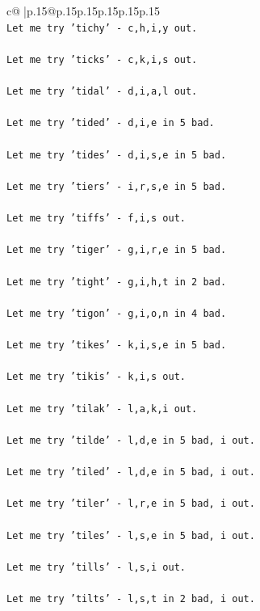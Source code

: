 \documentclass{article}
\begin{document}
{\begin{supertabular}{c@{$\;$}|p{.15\linewidth}@{}p{.15\linewidth}p{.15\linewidth}p{.15\linewidth}p{.15\linewidth}p{.15\linewidth}}
{{{\\ 
\texttt{Let me try 'tichy' {-} c,h,i,y out. } \\
\\ 
\texttt{Let me try 'ticks' {-} c,k,i,s out. } \\
\\ 
\texttt{Let me try 'tidal' {-} d,i,a,l out. } \\
\\ 
\texttt{Let me try 'tided' {-} d,i,e in 5 bad. } \\
\\ 
\texttt{Let me try 'tides' {-} d,i,s,e in 5 bad. } \\
\\ 
\texttt{Let me try 'tiers' {-} i,r,s,e in 5 bad. } \\
\\ 
\texttt{Let me try 'tiffs' {-} f,i,s out. } \\
\\ 
\texttt{Let me try 'tiger' {-} g,i,r,e in 5 bad. } \\
\\ 
\texttt{Let me try 'tight' {-} g,i,h,t in 2 bad. } \\
\\ 
\texttt{Let me try 'tigon' {-} g,i,o,n in 4 bad. } \\
\\ 
\texttt{Let me try 'tikes' {-} k,i,s,e in 5 bad. } \\
\\ 
\texttt{Let me try 'tikis' {-} k,i,s out. } \\
\\ 
\texttt{Let me try 'tilak' {-} l,a,k,i out. } \\
\\ 
\texttt{Let me try 'tilde' {-} l,d,e in 5 bad, i out. } \\
\\ 
\texttt{Let me try 'tiled' {-} l,d,e in 5 bad, i out. } \\
\\ 
\texttt{Let me try 'tiler' {-} l,r,e in 5 bad, i out. } \\
\\ 
\texttt{Let me try 'tiles' {-} l,s,e in 5 bad, i out. } \\
\\ 
\texttt{Let me try 'tills' {-} l,s,i out. } \\
\\ 
\texttt{Let me try 'tilts' {-} l,s,t in 2 bad, i out. } \\
}}}
\end{supertabular}}
\end{document}
